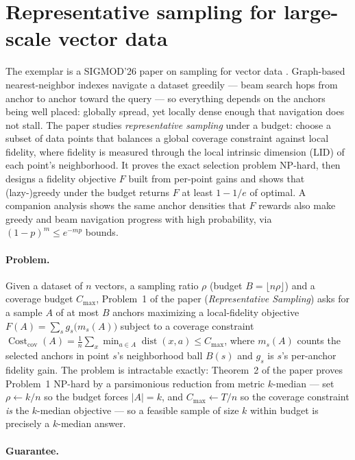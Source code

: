 \section{Representative sampling for large-scale vector data}
\label{sec:exc-031}

The exemplar is a SIGMOD'26 paper on sampling for vector data \citep{sigmod26-031}.
Graph-based nearest-neighbor indexes navigate a dataset greedily --- beam search hops
from anchor to anchor toward the query --- so everything depends on the anchors being
well placed: globally spread, yet locally dense enough that navigation does not stall.
The paper studies \emph{representative sampling} under a budget: choose a subset of
data points that balances a global coverage constraint against local fidelity, where
fidelity is measured through the local intrinsic dimension (LID) of each point's
neighborhood. It proves the exact selection problem NP-hard, then designs a fidelity
objective $F$ built from per-point gains and shows that (lazy-)greedy under the budget
returns $F$ at least $1-1/e$ of optimal. A companion analysis shows the same anchor
densities that $F$ rewards also make greedy and beam navigation progress with high
probability, via $(1-p)^{m}\le e^{-mp}$ bounds.

\paragraph{Problem.}
Given a dataset of $n$ vectors, a sampling ratio $\rho$ (budget $B=\lfloor n\rho\rfloor$)
and a coverage budget $C_{\max}$, Problem~1 of the paper (\emph{Representative
Sampling}) asks for a sample $A$ of at most $B$ anchors maximizing a local-fidelity
objective $F(A) = \sum_{s} g_s\bigl(m_s(A)\bigr)$ subject to a coverage constraint
$\operatorname{Cost}_{\mathrm{cov}}(A) = \frac1n\sum_{x}\min_{a\in A}
\operatorname{dist}(x,a) \le C_{\max}$, where $m_s(A)$ counts the selected anchors in
point $s$'s neighborhood ball $B(s)$ and $g_s$ is $s$'s per-anchor fidelity gain. The
problem is intractable exactly: Theorem~2 of the paper proves Problem~1 NP-hard by a
parsimonious reduction from metric $k$-median --- set $\rho \gets k/n$ so the budget
forces $|A| = k$, and $C_{\max} \gets T/n$ so the coverage constraint \emph{is} the
$k$-median objective --- so a feasible sample of size $k$ within budget is precisely a
$k$-median answer.

\paragraph{Guarantee.}


